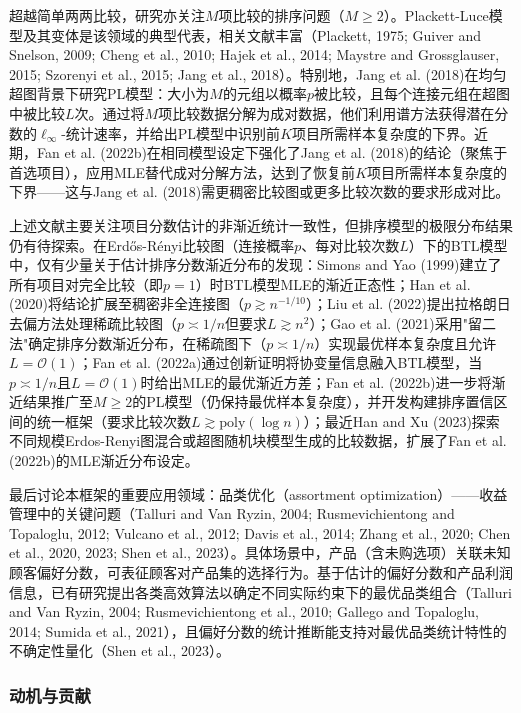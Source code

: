 超越简单两两比较，研究亦关注$M$项比较的排序问题（$M \geq 2$）。Plackett-Luce模型及其变体是该领域的典型代表，相关文献丰富（Plackett, 1975; Guiver and Snelson, 2009; Cheng et al., 2010; Hajek et al., 2014; Maystre and Grossglauser, 2015; Szorenyi et al., 2015; Jang et al., 2018）。特别地，Jang et al. (2018)在均匀超图背景下研究PL模型：大小为$M$的元组以概率$p$被比较，且每个连接元组在超图中被比较$L$次。通过将$M$项比较数据分解为成对数据，他们利用谱方法获得潜在分数的$\ell_\infty$-统计速率，并给出PL模型中识别前$K$项目所需样本复杂度的下界。近期，Fan et al. (2022b)在相同模型设定下强化了Jang et al. (2018)的结论（聚焦于首选项目），应用MLE替代成对分解方法，达到了恢复前$K$项目所需样本复杂度的下界——这与Jang et al. (2018)需更稠密比较图或更多比较次数的要求形成对比。

上述文献主要关注项目分数估计的非渐近统计一致性，但排序模型的极限分布结果仍有待探索。在Erdős-Rényi比较图（连接概率$p$、每对比较次数$L$）下的BTL模型中，仅有少量关于估计排序分数渐近分布的发现：Simons and Yao (1999)建立了所有项目对完全比较（即$p=1$）时BTL模型MLE的渐近正态性；Han et al. (2020)将结论扩展至稠密非全连接图（$p \gtrsim n^{-1/10}$）；Liu et al. (2022)提出拉格朗日去偏方法处理稀疏比较图（$p \asymp 1/n$但要求$L \gtrsim n^2$）；Gao et al. (2021)采用"留二法"确定排序分数渐近分布，在稀疏图下（$p \asymp 1/n$）实现最优样本复杂度且允许$L=\mathcal{O}(1)$；Fan et al. (2022a)通过创新证明将协变量信息融入BTL模型，当$p \asymp 1/n$且$L=\mathcal{O}(1)$时给出MLE的最优渐近方差；Fan et al. (2022b)进一步将渐近结果推广至$M\geq2$的PL模型（仍保持最优样本复杂度），并开发构建排序置信区间的统一框架（要求比较次数$L \gtrsim \mathrm{poly}(\log n)$）；最近Han and Xu (2023)探索不同规模Erdos-Renyi图混合或超图随机块模型生成的比较数据，扩展了Fan et al. (2022b)的MLE渐近分布设定。

最后讨论本框架的重要应用领域：品类优化（assortment optimization）——收益管理中的关键问题（Talluri and Van Ryzin, 2004; Rusmevichientong and Topaloglu, 2012; Vulcano et al., 2012; Davis et al., 2014; Zhang et al., 2020; Chen et al., 2020, 2023; Shen et al., 2023）。具体场景中，产品（含未购选项）关联未知顾客偏好分数，可表征顾客对产品集的选择行为。基于估计的偏好分数和产品利润信息，已有研究提出各类高效算法以确定不同实际约束下的最优品类组合（Talluri and Van Ryzin, 2004; Rusmevichientong et al., 2010; Gallego and Topaloglu, 2014; Sumida et al., 2021），且偏好分数的统计推断能支持对最优品类统计特性的不确定性量化（Shen et al., 2023）。



\subsubsection{动机与贡献}

